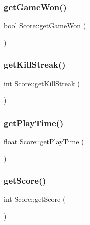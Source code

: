 \subsubsection{\texorpdfstring{get\+Game\+Won()}{getGameWon()}}
{\footnotesize\ttfamily bool Score\+::get\+Game\+Won (\begin{DoxyParamCaption}{ }\end{DoxyParamCaption})}

\mbox{\label{class_score_a3bd9796efe8e7cf9bb1c97597e56bc01}} 
\subsubsection{\texorpdfstring{get\+Kill\+Streak()}{getKillStreak()}}
{\footnotesize\ttfamily int Score\+::get\+Kill\+Streak (\begin{DoxyParamCaption}{ }\end{DoxyParamCaption})}

\mbox{\label{class_score_ae4fc66274baac2f13975f6139681b52c}} 
\subsubsection{\texorpdfstring{get\+Play\+Time()}{getPlayTime()}}
{\footnotesize\ttfamily float Score\+::get\+Play\+Time (\begin{DoxyParamCaption}{ }\end{DoxyParamCaption})}

\mbox{\label{class_score_a8627c93270c188a3fd28a25b1d07a9e7}} 
\subsubsection{\texorpdfstring{get\+Score()}{getScore()}}
{\footnotesize\ttfamily int Score\+::get\+Score (\begin{DoxyParamCaption}{ }\end{DoxyParamCaption})}

\mbox{\label{class_score_a9be80e91f6252cbb7c59d5212280e00f}} 
